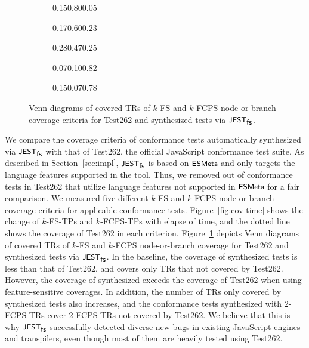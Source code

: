 \begin{figure}
  \centering
  \begin{subfigure}{0.19\textwidth}
    {0.15}{0.80}{0.05}
  \end{subfigure}
  \begin{subfigure}{0.19\textwidth}
    {0.17}{0.60}{0.23}
  \end{subfigure}
  \begin{subfigure}{0.19\textwidth}
    {0.28}{0.47}{0.25}
  \end{subfigure}
  \begin{subfigure}{0.19\textwidth}
    {0.07}{0.10}{0.82}
  \end{subfigure}
  \begin{subfigure}{0.19\textwidth}
    {0.15}{0.07}{0.78}
  \end{subfigure}
  \caption{
    Venn diagrams of covered TRs of $k$-FS and $k$-FCPS node-or-branch coverage
    criteria for Test262 and synthesized tests via $\textsf{\small JEST}_{\textsf{\small fs}}$.
  }
  \label{fig:venn-test262}
\end{figure}



We compare the coverage criteria of conformance tests automatically synthesized
via $\textsf{\small JEST}_{\textsf{\small fs}}$ with that of Test262, the official JavaScript conformance test
suite.
%
As described in Section~\ref{sec:impl}, $\textsf{\small JEST}_{\textsf{\small fs}}$ is based on $\textsf{\small ESMeta}$ and only
targets the language features supported in the tool.
%
Thus, we removed  out of  conformance tests in
Test262 that utilize language features not supported in $\textsf{\small ESMeta}$ for a fair
comparison.
%
We measured five different $k$-FS and $k$-FCPS node-or-branch coverage criteria
for  applicable conformance tests.
%
Figure~\ref{fig:cov-time} shows the change of $k$-FS-TPs and $k$-FCPS-TPs with
elapse of time, and the dotted line shows the coverage of Test262 in each
criterion.
%
Figure~\ref{fig:venn-test262} depicts Venn diagrams of covered TRs of $k$-FS and
$k$-FCPS node-or-branch coverage  for Test262 and synthesized tests via $\textsf{\small JEST}_{\textsf{\small fs}}$.
%
In the baseline, the coverage of synthesized tests is less than that of Test262,
and covers only  TRs that not covered by Test262.
%
However, the coverage of synthesized exceeds the coverage of Test262 when using
feature-sensitive coverages.
%
In addition, the number of TRs only covered by synthesized tests also increases,
and the conformance tests synthesized with $2$-FCPS-TRs cover 
2-FCPS-TRs not covered by Test262.
%
We believe that this is why $\textsf{\small JEST}_{\textsf{\small fs}}$ successfully detected diverse new bugs in
existing JavaScript engines and transpilers, even though most of them are
heavily tested using Test262.
